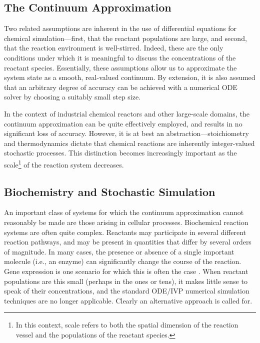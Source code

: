 \documentclass[12pt]{article}
\begin{document}
\subsection{The Continuum Approximation}

Two related assumptions are inherent in the use of differential
equations for chemical simulation---first, that the reactant
populations are large, and second, that the reaction environment is
well-stirred.  Indeed, these are the only conditions under which it is
meaningful to discuss the concentrations of the reactant species.
Essentially, these assumptions allow us to approximate the system
state as a smooth, real-valued continuum.  By extension, it is also
assumed that an arbitrary degree of accuracy can be achieved with a
numerical ODE solver by choosing a suitably small step size.

In the context of industrial chemical reactors and other large-scale
domains, the continuum approximation can be quite effectively
employed, and results in no significant loss of accuracy.  However, it
is at best an abstraction---stoichiometry and thermodynamics dictate
that chemical reactions are inherently integer-valued stochastic
processes.  This distinction becomes increasingly important as the
scale\footnote{In this context, scale refers to both the spatial
dimension of the reaction vessel and the populations of the reactant
species.} of the reaction system decreases.


\subsection{Biochemistry and Stochastic Simulation} \label{intro:biochem}

An important class of systems for which the continuum approximation
cannot reasonably be made are those arising in cellular
processes. Biochemical reaction systems are often quite
complex. Reactants may participate in several different reaction
pathways, and may be present in quantities that differ by several
orders of magnitude.  In many cases, the presence or absence of a
single important molecule (i.e., an enzyme) can significantly change
the course of the reaction.  Gene expression is one scenario for which
this is often the case \cite{mcadams-arkin-97, arkin-ross+98,
mcadams-arkin-99}.  When reactant populations are this small (perhaps
in the ones or tens), it makes little sense to speak of their
concentrations, and the standard ODE/IVP numerical simulation
techniques are no longer applicable.  Clearly an alternative approach
is called for.
\end{document}

